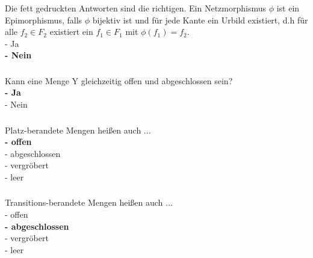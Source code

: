 \documentclass[a4paper,12pt]{scrartcl}
\begin{document}
\subsubsection{}
Die fett gedruckten Antworten sind die richtigen.
Ein Netzmorphismus $\phi$ ist ein Epimorphismus, falls $\phi$ bijektiv ist und für jede Kante ein Urbild existiert, d.h für alle $f_2\in F_2$ existiert ein $f_1\in F_1$ mit $\phi(f_1)=f_2$.\\
- Ja\\
\textbf{- Nein}
\subsubsection{}
Kann eine Menge Y gleichzeitig offen und abgeschlossen sein?\\
\textbf{- Ja}\\
- Nein
\subsubsection{}
Platz-berandete Mengen heißen auch ...\\
\textbf{- offen}\\
- abgeschlossen\\
- vergröbert\\
- leer
\subsubsection{}
Transitions-berandete Mengen heißen auch ...\\
- offen\\
\textbf{- abgeschlossen}\\
- vergröbert\\
- leer
\end{document}
